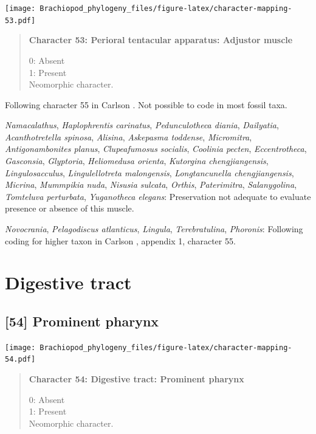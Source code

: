 \documentclass[openany]{book}
\begin{document}
\texttt{[image: Brachiopod\_phylogeny\_files/figure-latex/character-mapping-53.pdf]}

\begin{quote}
\textbf{Character 53: Perioral tentacular apparatus: Adjustor muscle}

0: Absent\\
1: Present\\
Neomorphic character.
\end{quote}

Following character 55 in Carlson
\citeyearpar{Carlson1995Phylogeneticrelationships}. Not possible to code
in most fossil taxa.

\hypertarget{Acanthotretella_spinosa-coding-53}{}
\emph{Namacalathus}, \emph{Haplophrentis carinatus},
\emph{Pedunculotheca diania}, \emph{Dailyatia}, \emph{Acanthotretella
spinosa}, \emph{Alisina}, \emph{Askepasma toddense}, \emph{Micromitra},
\emph{Antigonambonites planus}, \emph{Clupeafumosus socialis},
\emph{Coolinia pecten}, \emph{Eccentrotheca}, \emph{Gasconsia},
\emph{Glyptoria}, \emph{Heliomedusa orienta}, \emph{Kutorgina
chengjiangensis}, \emph{Lingulosacculus}, \emph{Lingulellotreta
malongensis}, \emph{Longtancunella chengjiangensis}, \emph{Micrina},
\emph{Mummpikia nuda}, \emph{Nisusia sulcata}, \emph{Orthis},
\emph{Paterimitra}, \emph{Salanygolina}, \emph{Tomteluva perturbata},
\emph{Yuganotheca elegans}: Preservation not adequate to evaluate
presence or absence of this muscle.

\hypertarget{Lingula-coding-53}{}
\emph{Novocrania}, \emph{Pelagodiscus atlanticus}, \emph{Lingula},
\emph{Terebratulina}, \emph{Phoronis}: Following coding for higher taxon
in Carlson \citeyearpar{Carlson1995Phylogeneticrelationships}, appendix
1, character 55.

\section{Digestive tract}\label{digestive-tract}

\subsection*{{[}54{]} Prominent pharynx}\label{prominent-pharynx}

\texttt{[image: Brachiopod\_phylogeny\_files/figure-latex/character-mapping-54.pdf]}

\begin{quote}
\textbf{Character 54: Digestive tract: Prominent pharynx}

0: Absent\\
1: Present\\
Neomorphic character.
\end{quote}
\end{document}
